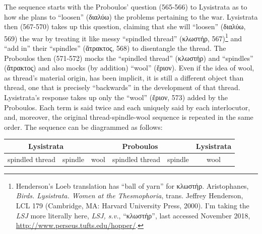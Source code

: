 \documentclass[12pt]{article}
\begin{document}
The sequence starts with the Proboulos' question (565-566) to Lysistrata as to how she plans to ``loosen'' (διαλύω) the problems pertaining to the war. Lysistrata then (567-570) takes up this question, claiming that she will ``loosen'' (διαλύω, 569) the war by treating it like messy ``spindled thread'' (κλωστήρ, 567)\footnote{Henderson's Loeb translation has ``ball of yarn'' for κλωστήρ. Aristophanes, \textit{Birds. Lysistrata. Women at the Thesmophoria}, trans. Jeffrey Henderson, LCL 179 (Cambridge, MA: Harvard University Press, 2000). I'm taking the \textit{LSJ} more literally here, \textit{LSJ, s.v.}, ``κλωστήρ'', last accessed November 2018, \url{http://www.perseus.tufts.edu/hopper/}.} and ``add in'' their ``spindles'' (ἄτρακτος, 568) to disentangle the thread. The Proboulos then (571-572) mocks the ``spindled thread'' (κλωστήρ) and ``spindles'' (ἄτρακτος) and also mocks (by addition) ``wool'' (ἔριον). Even if the idea of wool, as thread's material origin, has been implicit, it is still a different object than thread, one that is precisely ``backwards'' in the development of that thread. Lysistrata's response takes up only the ``wool'' (ἔριον, 573) added by the Proboulos. Each term is said twice and each uniquely said by each interlocutor, and, moreover, the original thread-spindle-wool sequence is repeated in the same order. The sequence can be diagrammed as follows:


\begin{table}[htbp]
\centering
\begin{singlespacing}
\begin{tabular}{c| c | c | c| c | c}
\multicolumn{2}{c|}{Lysistrata} & \multicolumn{3}{c|}{Proboulos} & Lysistrata \\
\hline
spindled thread & spindle & wool & spindled thread & spindle & wool \\
\end{tabular}
\end{singlespacing}
\end{table}
\end{document}
